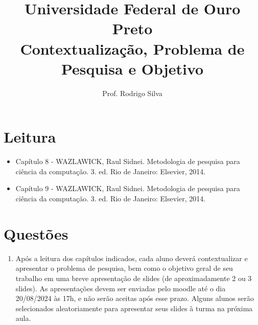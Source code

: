 \documentclass{article}
\title{\vspace{-2 cm}Universidade Federal de Ouro Preto \\ Contextualização, Problema de Pesquisa e Objetivo}
\author{Prof. Rodrigo Silva}
\date{}
\begin{document}
\maketitle

\section{Leitura}

\begin{itemize}
    \item Capítulo 8 - WAZLAWICK, Raul Sidnei. Metodologia de pesquisa para ciência da computação. 3. ed. Rio de Janeiro: Elsevier, 2014.
    \item Capítulo 9 - WAZLAWICK, Raul Sidnei. Metodologia de pesquisa para ciência da computação. 3. ed. Rio de Janeiro: Elsevier, 2014.
\end{itemize}

\section{Questões}

\begin{enumerate}
\item Após a leitura dos capítulos indicados, cada aluno deverá contextualizar e apresentar o problema de pesquisa, bem como o objetivo geral de seu trabalho em uma breve apresentação de slides (de aproximadamente 2 ou 3 slides). As apresentações devem ser enviadas pelo moodle até o dia 20/08/2024 às 17h, e não serão aceitas após esse prazo. Alguns alunos serão selecionados aleatoriamente para apresentar seus slides à turma na próxima aula.
\end{enumerate}


%
%
\end{document}
